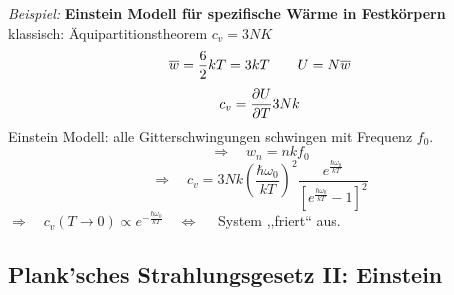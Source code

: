 \emph{Beispiel:} \textbf{Einstein Modell für spezifische Wärme in Festkörpern}\\[5pt]
klassisch: Äquipartitionstheorem $ c_v = 3 N K $
\begin{equation*}
\overline{w} = \frac{6}{2} k T = 3 kT \qquad U = N \overline{w}
\end{equation*}
\begin{equation*}
c_v = \frac{\partial U}{\partial T} 3 N k
\end{equation*}
Einstein Modell: alle Gitterschwingungen schwingen mit Frequenz $ f_0 $.
\begin{equation*}
\Rightarrow \quad w_n = n k f_0
\end{equation*}
\begin{equation*}
\Rightarrow \quad c_v = 3 N k \left(\frac{\hbar \omega_0}{kT}\right)^2 \frac{e^{\frac{\hbar \omega_0}{kT}}}{\left[e^{\frac{\hbar \omega_0}{kT}} - 1\right]^2}
\end{equation*}
$ \Rightarrow \quad c_v(T \to 0) \propto e^{-\frac{\hbar \omega_0}{kT}} \quad \Leftrightarrow \quad  $ System ,,friert`` aus.


\noindent
{}

\subsection{Plank'sches Strahlungsgesetz II: Einstein}

